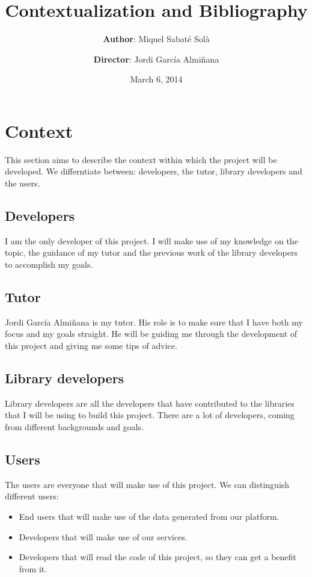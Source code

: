 \documentclass[a4paper,12pt]{article}
\title{\bf Contextualization and Bibliography}
\author{
  {\bf Author}: Miquel Sabaté Solà
  \and
  {\bf Director}: Jordi García Almiñana
}
\date{March 6, 2014}
\newcommand{\mylist}{
\begin{itemize}
\setlength{\itemsep}{1pt}
\setlength{\parskip}{0pt}
\setlength{\parsep}{0pt}}
\newcommand{\mylistend}{\end{itemize}}
\begin{document}
\clearpage\maketitle

\setcounter{page}{1}
\section{Context}

This section aims to describe the context within which the project will be
developed. We differntiate between: developers, the tutor, library developers
and the users.

\subsection{Developers}

I am the only developer of this project. I will make use of my knowledge on the
topic, the guidance of my tutor and the previous work of the library developers
to accomplish my goals.

\subsection{Tutor}

Jordi García Almiñana is my tutor. His role is to make sure that I
have both my focus and my goals straight. He will be guiding me through the
development of this project and giving me some tips of advice.

\subsection{Library developers}

Library developers are all the developers that have contributed to the
libraries that I will be using to build this project. There are a lot of
developers, coming from different backgrounds and goals.

\subsection{Users}

The users are everyone that will make use of this project. We can distinguish
different users:

\mylist
\item End users that will make use of the data generated from our platform.
\item Developers that will make use of our services.
\item Developers that will read the code of this project, so they can get a
benefit from it.
\mylistend
\end{document}
